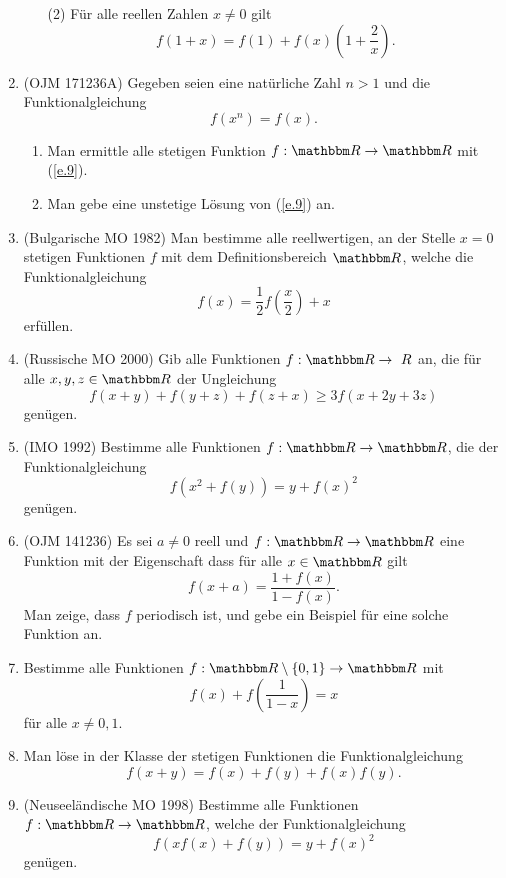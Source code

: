 \documentclass[11pt]{article}
\begin{document}
\begin{enumerate}
\begin{enumerate}
  \item[(2)] F\"{u}r alle reellen Zahlen  $x\neq 0$  gilt
  \[f(1+x)=f(1)+f(x)\left(1+\frac{2}{x}\right).\]

\end{enumerate}
\item (OJM 171236A) \label{a.5} Gegeben seien eine nat\"{u}rliche Zahl $n>1$
und die Funktionalgleichung
\begin{equation}\label{e.9}
  f(x^n)=f(x).
\end{equation}
\begin{enumerate}
  \item Man ermittle alle stetigen Funktion $f:\R\to\R$ mit (\ref{e.9}).
  \item Man gebe eine unstetige L\"{o}sung von (\ref{e.9}) an.
\end{enumerate}
\item (Bulgarische MO 1982) Man bestimme alle reellwertigen, an der Stelle
$x=0$ stetigen Funktionen $f$ mit dem Definitionsbereich $\R$, welche die
Funktionalgleichung
\[f(x)=\frac{1}{2}f\left(\frac{x}{2}\right)+x\]
erf\"{u}llen.
\item (Russische MO 2000) Gib alle Funktionen $f:\R\to\ R$ an, die f\"{u}r
alle $x,y,z\in\R$ der Ungleichung
\[f(x+y)+f(y+z)+f(z+x)\geq 3f(x+2y+3z)\]
gen\"{u}gen.
\item (IMO 1992) Bestimme alle Funktionen $f:\R\to\R$, die der
Funktionalgleichung
\[f(x^2+f(y))=y+f(x)^2\]
gen\"{u}gen.
\item (OJM 141236) \label{a.10} Es sei $a\neq 0$ reell und $f:\R\to\R$ eine
Funktion mit der Eigenschaft da{ss} f\"{u}r alle $x\in\R$ gilt
\[f(x+a)=\frac{1+f(x)}{1-f(x)}.\]
Man zeige, da{ss} $f$ periodisch ist, und gebe ein Beispiel f\"{u}r eine
solche Funktion an.
\item \label{a.12} Bestimme alle Funktionen $f:\R\setminus \{0,1\}\to\R$ mit
\[f(x)+f\left(\frac{1}{1-x}\right)=x\]
f\"{u}r alle $x\neq 0,1$.
\item \label{a.13} Man l\"{o}se in der Klasse der stetigen Funktionen die
Funktionalgleichung
\[f(x+y)=f(x)+f(y)+f(x)f(y).\]
\item (Neuseel\"{a}ndische MO 1998) Bestimme alle Funktionen $f:\R\to\R$,
welche der Funktionalgleichung
\[f(xf(x)+f(y))=y+f(x)^2\]
gen\"{u}gen.

\end{enumerate}
\end{document}
